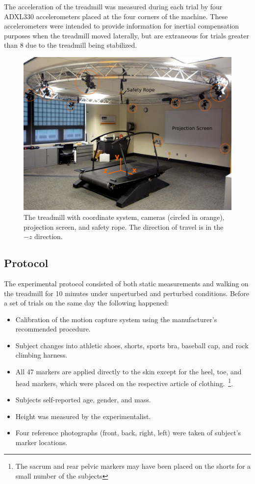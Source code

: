 \documentclass[fleqn,12pt]{wlpeerj}
\begin{document}
The acceleration of the treadmill was measured during each trial by four
ADXL330 accelerometers placed at the four corners of the machine. These
accelerometers were intended to provide information for inertial compensation
purposes when the treadmill moved laterally, but are extraneous for trials
greater than 8 due to the treadmill being stabilized.
%
\begin{figure}
  \centering
  \includegraphics{figures/treadmill.png}
  \caption{The treadmill with coordinate system, cameras (circled in orange),
    projection screen, and safety rope. The direction of travel is in the $-z$
    direction.}
  \label{fig:treadmill}
\end{figure}

\subsection*{Protocol}
%
The experimental protocol consisted of both static measurements and walking on
the treadmill for 10 minutes under unperturbed and perturbed conditions. Before
a set of trials on the same day the following happened:
%
\begin{itemize}
  \item Calibration of the motion capture system using the manufacturer's
    recommended procedure.
  \item Subject changes into athletic shoes, shorts, sports bra, baseball
    cap, and rock climbing harness.
  \item All 47 markers are applied directly to the skin except for the heel,
    toe, and head markers, which were placed on the respective article of
    clothing.~\footnote{The sacrum and rear pelvic markers may have been placed
    on the shorts for a small number of the subjects}.
  \item Subjects self-reported age, gender, and mass.
  \item Height was measured by the experimentalist.
  \item Four reference photographs (front, back, right, left) were taken of
    subject's marker locations.
\end{itemize}
\end{document}
